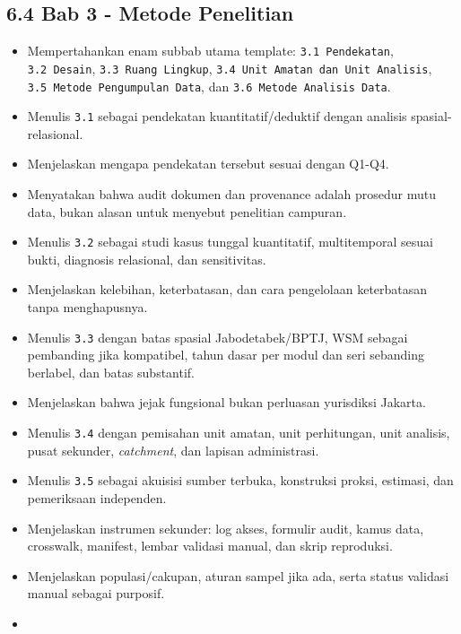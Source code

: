 \documentclass[
  indonesian,
  11pt,
]{article}
\providecommand{\tightlist}{%
  \setlength{\itemsep}{0pt}\setlength{\parskip}{0pt}}
\renewcommand{\tightlist}{%
  \setlength{\itemsep}{0.22em}%
  \setlength{\parskip}{0pt}%
}
\begin{document}
\subsection{6.4 Bab 3 - Metode
Penelitian}\label{bab-3---metode-penelitian}

\begin{itemize}
\tightlist
\item[$\square$]
  Mempertahankan enam subbab utama template: \texttt{3.1\ Pendekatan},
  \texttt{3.2\ Desain}, \texttt{3.3\ Ruang\ Lingkup},
  \texttt{3.4\ Unit\ Amatan\ dan\ Unit\ Analisis},
  \texttt{3.5\ Metode\ Pengumpulan\ Data}, dan
  \texttt{3.6\ Metode\ Analisis\ Data}.
\item[$\square$]
  Menulis \texttt{3.1} sebagai pendekatan kuantitatif/deduktif dengan
  analisis spasial-relasional.
\item[$\square$]
  Menjelaskan mengapa pendekatan tersebut sesuai dengan Q1-Q4.
\item[$\square$]
  Menyatakan bahwa audit dokumen dan provenance adalah prosedur mutu
  data, bukan alasan untuk menyebut penelitian campuran.
\item[$\square$]
  Menulis \texttt{3.2} sebagai studi kasus tunggal kuantitatif,
  multitemporal sesuai bukti, diagnosis relasional, dan sensitivitas.
\item[$\square$]
  Menjelaskan kelebihan, keterbatasan, dan cara pengelolaan keterbatasan
  tanpa menghapusnya.
\item[$\square$]
  Menulis \texttt{3.3} dengan batas spasial Jabodetabek/BPTJ, WSM
  sebagai pembanding jika kompatibel, tahun dasar per modul dan seri
  sebanding berlabel, dan batas substantif.
\item[$\square$]
  Menjelaskan bahwa jejak fungsional bukan perluasan yurisdiksi Jakarta.
\item[$\square$]
  Menulis \texttt{3.4} dengan pemisahan unit amatan, unit perhitungan,
  unit analisis, pusat sekunder, \emph{catchment}, dan lapisan
  administrasi.
\item[$\square$]
  Menulis \texttt{3.5} sebagai akuisisi sumber terbuka, konstruksi
  proksi, estimasi, dan pemeriksaan independen.
\item[$\square$]
  Menjelaskan instrumen sekunder: log akses, formulir audit, kamus data,
  crosswalk, manifest, lembar validasi manual, dan skrip reproduksi.
\item[$\square$]
  Menjelaskan populasi/cakupan, aturan sampel jika ada, serta status
  validasi manual sebagai purposif.
\item[$\square$]

\end{itemize}
\end{document}
